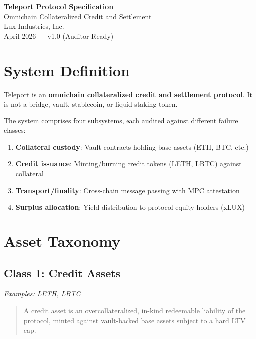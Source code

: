 \documentclass[11pt,a4paper]{article}
\begin{document}
\begin{center}
{\LARGE\bfseries Teleport Protocol Specification}\\[0.5em]
{\Large Omnichain Collateralized Credit and Settlement}\\[1em]
{\large Lux Industries, Inc.}\\[0.5em]
{\normalsize April 2026 --- v1.0 (Auditor-Ready)}
\end{center}

\vspace{1em}

\tableofcontents
\newpage

\section{System Definition}

Teleport is an \textbf{omnichain collateralized credit and settlement protocol}. It is not a bridge, vault, stablecoin, or liquid staking token.

The system comprises four subsystems, each audited against different failure classes:

\begin{enumerate}[leftmargin=2em]
\item \textbf{Collateral custody}: Vault contracts holding base assets (ETH, BTC, etc.)
\item \textbf{Credit issuance}: Minting/burning credit tokens (LETH, LBTC) against collateral
\item \textbf{Transport/finality}: Cross-chain message passing with MPC attestation
\item \textbf{Surplus allocation}: Yield distribution to protocol equity holders (xLUX)
\end{enumerate}

\section{Asset Taxonomy}

\subsection{Class 1: Credit Assets}

\textit{Examples: LETH, LBTC}

\begin{quote}
A credit asset is an overcollateralized, in-kind redeemable liability of the protocol, minted against vault-backed base assets subject to a hard LTV cap.
\end{quote}
\end{document}

